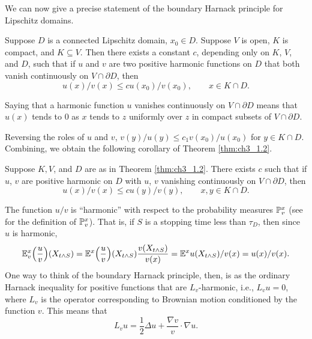 
We can now give a precise statement of the boundary Harnack principle for Lipschitz domains.

\begin{theorem}\label{thm:ch3_1.2}
Suppose $D$ is a connected Lipschitz domain, $x_0 \in D$. Suppose $V$ is open, $K$ is compact, and $K \subseteq V$. Then there exists a constant $c$, depending only on $K$, $V$, and $D$, such that if $u$ and $v$ are two positive harmonic functions on $D$ that both vanish continuously on $V \cap \partial D$, then
\begin{equation}\label{eq:ch3_1.3}
    u(x)/v(x) \leq cu(x_0)/v(x_0), \qquad x \in K \cap D.
\end{equation}
\end{theorem}

Saying that a harmonic function $u$ vanishes continuously on $V \cap \partial D$ means that $u(x)$ tends to $0$ as $x$ tends to $z$ uniformly over $z$ in compact subsets of $V \cap \partial D$.

Reversing the roles of $u$ and $v$, $v(y)/u(y) \leq c_1v(x_0)/u(x_0)$ for $y \in K \cap D$. Combining, we obtain the following corollary of Theorem \ref{thm:ch3_1.2}.

\begin{corollary}\label{cor:ch3_1.3}
Suppose $K,V$, and $D$ are as in Theorem \ref{thm:ch3_1.2}. There exists $c$ such that if $u$, $v$ are positive harmonic on $D$ with $u$, $v$ vanishing continuously on $V \cap \partial D$, then
\begin{equation}\label{eq:ch3_1.4}
u(x)/v(x) \leq cu(y)/v(y), \qquad x,y \in K \cap D.
\end{equation}
\end{corollary}

The function $u/v$ is ``harmonic'' with respect to the probability measures $\P_v^x$ (see  for the definition of $\P_v^x$). That is, if $S$ is a stopping time less than $\tau_D$, then since $u$ is harmonic,
\[
    \E_v^x\Big(\frac{u}{v}\Big)(X_{t\wedge S}) = \E^x\Big(\frac{u}{v}\Big)(X_{t\wedge S})\frac{v(X_{t\wedge S})}{v(x)} = \E^xu(X_{t\wedge S})/v(x) = u(x)/v(x).
\]
One way to think of the boundary Harnack principle, then, is as the ordinary Harnack inequality for positive functions that are $L_v$-harmonic, i.e., $L_vu = 0$, where $L_v$ is the operator corresponding to Brownian motion conditioned by the function $v$. This means that
\begin{equation}\label{eq:ch3_1.5}
    L_vu = \frac{1}{2}\Delta u + \frac{\nabla v}{v} \cdot \nabla u.
\end{equation}

